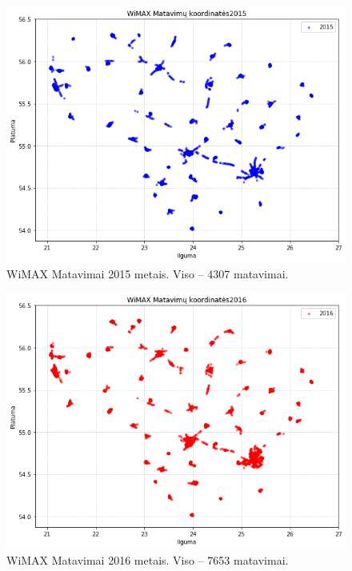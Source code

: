 \documentclass{VUMIFPSbakalaurinis}
\begin{document}
\begin{figure}[H]
	\centering
	\includegraphics[scale=0.33]{img/WiMAX-1}
	\caption{WiMAX Matavimai 2015 metais. Viso – 4307 matavimai.}
	\label{img:WiMAX-1}
\end{figure}
\begin{figure}[H]
	\centering
	\includegraphics[scale=0.33]{img/WiMAX-2}
	\caption{WiMAX Matavimai 2016 metais. Viso – 7653 matavimai.}
	\label{img:WiMAX-2}
\end{figure}
\end{document}
